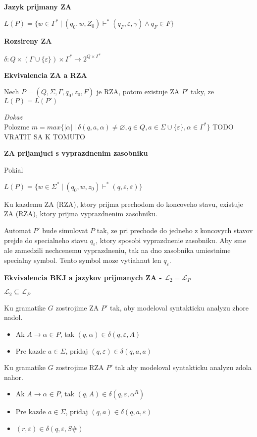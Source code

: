 \documentclass[12pt]{article}
\newcommand{\pipesep}{\hspace{3pt} \vert \hspace{3pt}}
\begin{document}
\textbf{Jazyk prijmany ZA}

$L(P) = \{w \in \Gamma^{*} \pipesep (q_{0},w,Z_{0}) \vdash^{*} (q_{F},\varepsilon,\gamma) \land q_{F} \in F\}$

\textbf{Rozsireny ZA}

$\delta: Q \times (\Gamma \cup \{\varepsilon\}) \times \Gamma^{*} \to 2^{Q \times \Gamma^{*}}$

\textbf{Ekvivalencia ZA a RZA}

Nech $P = (Q,\Sigma,\Gamma,q_{0},z_{0},F)$ je RZA, potom existuje ZA $P'$ taky, ze $L(P) = L(P')$

\emph{Dokaz} \\
Polozme $m = max\{|\alpha| \pipesep \delta(q,a,\alpha) \not= \varnothing, q \in Q, a \in \Sigma \cup \{\varepsilon\}, \alpha \in \Gamma^{*}\}$
TODO VRATIT SA K TOMUTO

\textbf{ZA prijamjuci s vyprazdnenim zasobniku}

Pokial

$L(P) = \{w \in \Sigma^{*} \pipesep (q_{0},w,z_{0}) \vdash^{*} (q,\varepsilon,\varepsilon)\}$

Ku kazdemu ZA (RZA), ktory prijma prechodom do koncoveho stavu, existuje ZA (RZA), ktory prijma vyprazdnenim zasobniku.

Automat $P'$ bude simulovat $P$ tak, ze pri prechode do jedneho z koncovych stavov prejde do specialneho stavu $q_{\varepsilon}$, ktory sposobi vyprazdnenie zasobniku.
Aby sme ale zamedzili nechcenemu vyprazdneniu, tak na dno zasobnika umiestnime specialny symbol. Tento symbol moze vytiahnut len $q_{\varepsilon}$.

\textbf{Ekvivalencia BKJ a jazykov prijmanych ZA - $\mathcal{L}_{2} = \mathcal{L}_{P}$}

$\mathcal{L}_{2} \subseteq \mathcal{L}_{P}$

Ku gramatike $G$ zostrojime ZA $P'$ tak, aby modeloval syntakticku analyzu zhore nadol.
\begin{itemize}
	\item Ak $A \to \alpha \in P$, tak $(q,\alpha) \in \delta(q,\varepsilon,A)$
	\item Pre kazde $a \in \Sigma$, pridaj $(q,\varepsilon) \in \delta(q,a,a)$
\end{itemize}

Ku gramatike $G$ zostrojime RZA $P'$ tak aby modeloval syntakticku analyzu zdola nahor.
\begin{itemize}
	\item Ak $A \to \alpha \in P$, tak $(q,A) \in \delta(q,\varepsilon,\alpha^{R})$
	\item Pre kazde $a \in \Sigma$, pridaj $(q,a) \in \delta(q,a,\varepsilon)$
	\item $(r,\varepsilon) \in \delta(q,\varepsilon,S\#)$
\end{itemize}
\end{document}
